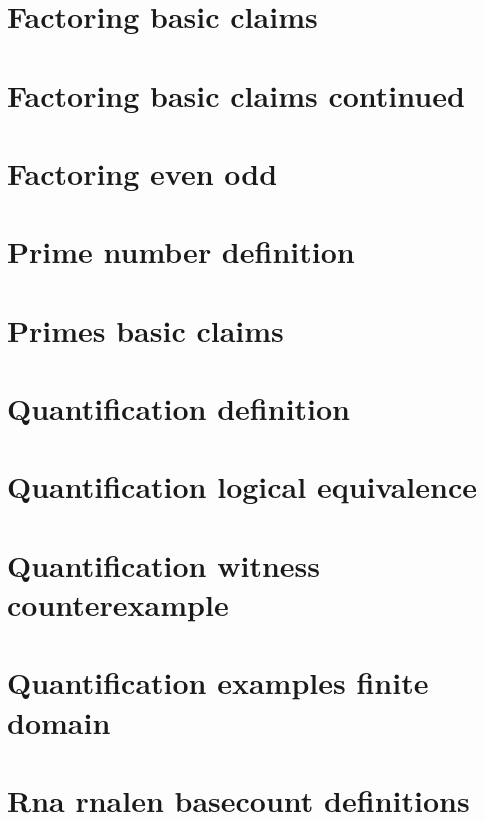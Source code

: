 \section*{Factoring basic claims}

\vfill
\section*{Factoring basic claims continued}

\vfill
\section*{Factoring even odd}

\vfill
\section*{Prime number definition}

\vfill
\section*{Primes basic claims}

\vfill
\section*{Quantification definition}

\vfill
\section*{Quantification logical equivalence}

\vfill
\section*{Quantification witness counterexample}

\vfill
\section*{Quantification examples finite domain}

\vfill
\section*{Rna rnalen basecount definitions}

\vfill
